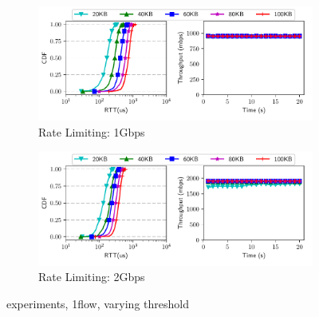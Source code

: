 
\begin{figure}[!tb]
\centering

\begin{subfigure}[b]{0.9\textwidth}
\centering
\includegraphics[width=\textwidth]{rate_limiter/raw_data/dem_benchmark/1gbps.pdf}
\caption{Rate Limiting: 1Gbps}
\label{fig:dem-1g} 
\end{subfigure}
\begin{subfigure}[b]{0.9\textwidth}
\centering
\includegraphics[width=\textwidth]{rate_limiter/raw_data/dem_benchmark/2gbps.pdf}
\caption{Rate Limiting: 2Gbps}
\label{fig:dem-2g} 
\end{subfigure}
\caption{\dem{} experiments, 1flow, varying threshold}
\label{fig:dem} 
\end{figure}

